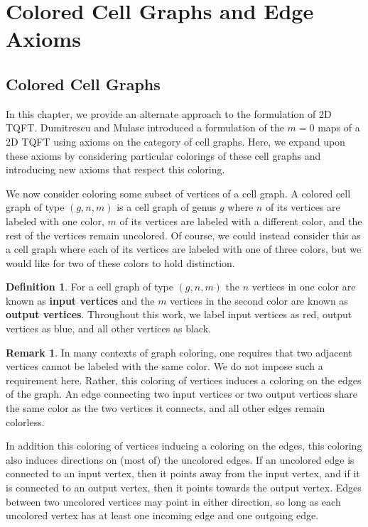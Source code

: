\documentclass{amsart}
\theoremstyle{definition}
\newtheorem{Def}[Lem]{Definition}
\newtheorem{Rmk}[Lem]{Remark}
\begin{document}
\section{Colored Cell Graphs and Edge Axioms}\label{SectionCCG}






\subsection{ Colored Cell Graphs}\label{chap:ccg}

In this chapter, we provide an alternate approach to the formulation of 2D TQFT. Dumitrescu and Mulase \cite{DM_invitation} introduced a formulation of the $m=0$ maps of a 2D TQFT using axioms on the category of cell graphs. Here, we expand upon these axioms by considering particular colorings of these cell graphs and introducing new axioms that respect this coloring.

We now consider coloring some subset of vertices of a cell graph. A colored cell graph of type $(g,n,m)$ is a cell graph of genus $g$ where $n$ of its vertices are labeled with one color, $m$ of its vertices are labeled with a different color, and the rest of the vertices remain uncolored. Of course, we could instead consider this as a cell graph where each of its vertices are labeled with one of three colors, but we would like for two of these colors to hold distinction.
\begin{Def}
    For a cell graph of type $(g,n,m)$ the $n$ vertices in one color are known as \textbf{input vertices} and the $m$ vertices in the second color are known as \textbf{output vertices}. Throughout this work, we label input vertices as red, output vertices as blue, and all other vertices as black.
\end{Def}
\begin{Rmk}
    In many contexts of graph coloring, one requires that two adjacent vertices cannot be labeled with the same color. We do not impose such a requirement here. Rather, this coloring of vertices induces a coloring on the edges of the graph. An edge connecting two input vertices or two output vertices share the same color as the two vertices it connects, and all other edges remain colorless.
\end{Rmk}
\noindent In addition this coloring of vertices inducing a coloring on the edges, this coloring also induces directions on (most of) the uncolored edges. If an uncolored edge is connected to an input vertex, then it points away from the input vertex, and if it is connected to an output vertex, then it points towards the output vertex. Edges between two uncolored vertices may point in either direction, so long as each uncolored vertex has at least one incoming edge and one outgoing edge.
\end{document}
